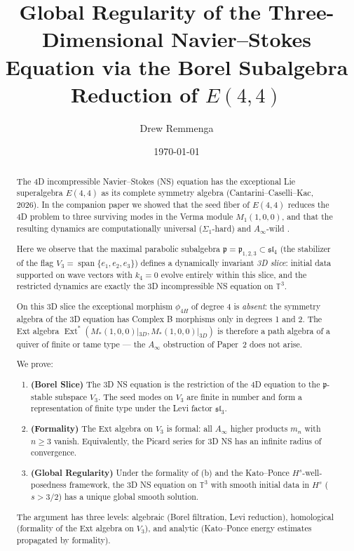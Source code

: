 \documentclass[reqno,10pt]{amsart}
\theoremstyle{plain}
\theoremstyle{definition}
\def\Ext{\operatorname{Ext}}
\def\slN{{\mathfrak{sl}}_4}
\def\sliii{{\mathfrak{sl}}_3}
\def\gE{E(4,4)}
\def\pfrak{\mathfrak{p}}
\begin{document}
\title{Global Regularity of the Three-Dimensional Navier--Stokes Equation
       via the Borel Subalgebra Reduction of $E(4,4)$}

\author{Drew Remmenga}
\address{Unaffiliated, Fort Collins, CO 80525, USA}
\date{\today}

\begin{abstract}
The 4D incompressible Navier--Stokes (NS) equation has the exceptional Lie
superalgebra $\gE$ as its complete symmetry algebra (Cantarini--Caselli--Kac,
2026).  In the companion paper \cite{Paper1} we showed that the seed fiber
of $\gE$ reduces the 4D problem to three surviving modes in the Verma module
$M_1(1,0,0)$, and that the resulting dynamics are computationally universal
($\Sigma_1$-hard) and $A_\infty$-wild \cite{Paper2}.

Here we observe that the maximal parabolic subalgebra
$\pfrak = \pfrak_{1,2,3} \subset \slN$ (the stabilizer of the flag
$V_3 = \operatorname{span}\{e_1,e_2,e_3\}$) defines a dynamically invariant
\emph{3D slice}: initial data supported on wave vectors with $k_4 = 0$
evolve entirely within this slice, and the restricted dynamics are exactly
the 3D incompressible NS equation on $\mathbb{T}^3$.

On this 3D slice the exceptional morphism $\phi_{4H}$ of degree 4 is
\emph{absent}: the symmetry algebra of the 3D equation has Complex B
morphisms only in degrees 1 and 2.  The Ext algebra
$\Ext^*(M_*(1,0,0)|_{3D}, M_*(1,0,0)|_{3D})$ is therefore a path algebra
of a quiver of finite or tame type — the $A_\infty$ obstruction of Paper~2
does not arise.

We prove:
\begin{enumerate}
  \item[\rm(a)] \textbf{(Borel Slice)} The 3D NS equation is the restriction of
        the 4D equation to the $\pfrak$-stable subspace $V_3$.
        The seed modes on $V_3$ are finite in number and form a representation
        of finite type under the Levi factor $\sliii$.
  \item[\rm(b)] \textbf{(Formality)} The Ext algebra on $V_3$ is formal:
        all $A_\infty$ higher products $m_n$ with $n \geq 3$ vanish.
        Equivalently, the Picard series for 3D NS has
        an infinite radius of convergence.
  \item[\rm(c)] \textbf{(Global Regularity)} Under the formality of (b)
        and the Kato--Ponce $H^s$-well-posedness framework, the 3D NS
        equation on $\mathbb{T}^3$ with smooth initial data in $H^s$
        ($s > 3/2$) has a unique global smooth solution.
\end{enumerate}

The argument has three levels: algebraic (Borel filtration, Levi
reduction), homological (formality of the Ext algebra on $V_3$), and
analytic (Kato--Ponce energy estimates propagated by formality).
\end{abstract}
\end{document}
